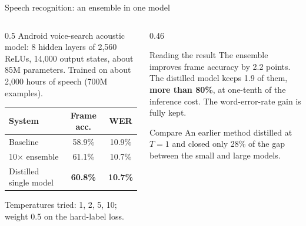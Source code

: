 \documentclass[aspectratio=169,11pt]{beamer}
\begin{document}
\begin{frame}{Speech recognition: an ensemble in one model}
  \begin{columns}[T]
    \begin{column}{0.5\textwidth}
      \small
      Android voice-search acoustic model: 8 hidden layers of 2,560 ReLUs, 14,000 output states, about 85M parameters. Trained on about 2,000 hours of speech (700M examples).
      \vspace{2mm}

      \begin{tabular}{@{}lcc@{}}
        \toprule
        System & Frame acc. & WER\\
        \midrule
        Baseline & 58.9\% & 10.9\%\\
        10$\times$ ensemble & 61.1\% & 10.7\%\\
        Distilled single model & \textbf{60.8\%} & \textbf{10.7\%}\\
        \bottomrule
      \end{tabular}
      \vspace{1mm}

      {\scriptsize Temperatures tried: 1, 2, 5, 10; weight 0.5 on the hard-label loss.}
    \end{column}
    \begin{column}{0.46\textwidth}
      \begin{exampleblock}{Reading the result}
        \small
        The ensemble improves frame accuracy by 2.2 points.
        The distilled model keeps 1.9 of them, \textbf{more than 80\%}, at one-tenth of the inference cost.
        The word-error-rate gain is fully kept.
      \end{exampleblock}
      \begin{block}{Compare}
        \small
        An earlier method distilled at $T=1$ and closed only 28\% of the gap between the small and large models.
      \end{block}
    \end{column}
  \end{columns}
\end{frame}
\end{document}
